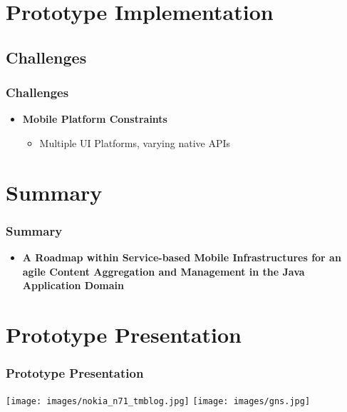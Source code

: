 \documentclass[blue]{beamer}
\begin{document}

\section{Prototype Implementation}

\subsection{Challenges}
\frame
{
\frametitle{\textbf{Challenges}}
\begin{itemize}
\item \textbf{Mobile Platform Constraints}
  \begin{itemize}[<+-|alert@+>]
    \item \color[rgb]{1.0,0.0,0.0} Multiple UI Platforms, varying native APIs
  \end{itemize}
\end{itemize}
}






\section*{Summary}
\frame
{
\frametitle{\textbf{Summary}}
\begin{itemize}
\item \textbf{A Roadmap within Service-based Mobile Infrastructures for an agile Content Aggregation and Management in the Java Application Domain}
\end{itemize}
}


\section{Prototype Presentation}
\frame
{
\frametitle{\textbf{Prototype Presentation}}
\texttt{[image: images/nokia\_n71\_tmblog.jpg]}
\texttt{[image: images/gns.jpg]}
}


\end{document}
